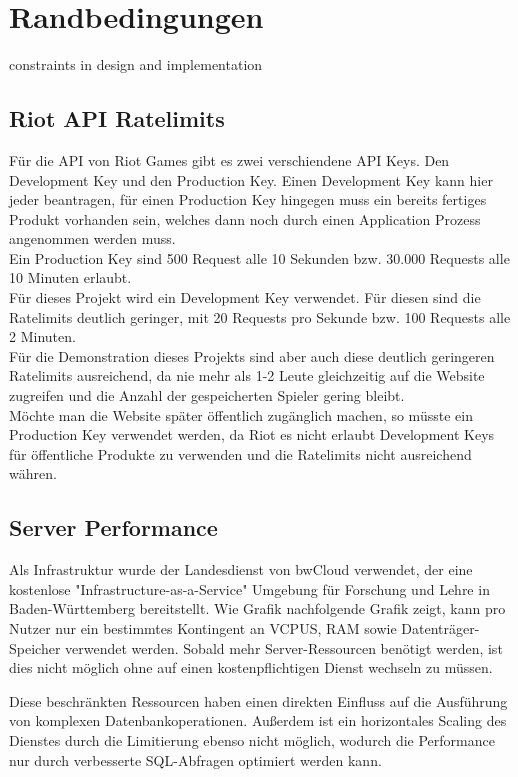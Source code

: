 \section{Randbedingungen}
constraints in design and implementation

\subsection{Riot API Ratelimits}\label{riot-api-ratelimits}
Für die API von Riot Games gibt es zwei verschiendene API Keys. Den Development Key und den Production Key. Einen Development Key kann hier jeder beantragen, für einen Production Key hingegen muss ein bereits fertiges Produkt vorhanden sein, welches dann noch durch einen Application Prozess angenommen werden muss.\\
Ein Production Key sind 500 Request alle 10 Sekunden bzw. 30.000 Requests alle 10 Minuten erlaubt.\\
Für dieses Projekt wird ein Development Key verwendet. Für diesen sind die Ratelimits deutlich geringer, mit 20 Requests pro Sekunde bzw. 100 Requests alle 2 Minuten.\\
Für die Demonstration dieses Projekts sind aber auch diese deutlich geringeren Ratelimits ausreichend, da nie mehr als 1-2 Leute gleichzeitig auf die Website zugreifen und die Anzahl der gespeicherten Spieler gering bleibt.\\
Möchte man die Website später öffentlich zugänglich machen, so müsste ein Production Key verwendet werden, da Riot es nicht erlaubt Development Keys für öffentliche Produkte zu verwenden und die Ratelimits nicht ausreichend währen.

\subsection{Server Performance}

Als Infrastruktur wurde der Landesdienst von bwCloud verwendet, der eine kostenlose
"Infrastructure-as-a-Service" Umgebung für Forschung und Lehre in Baden-Württemberg bereitstellt.
Wie Grafik nachfolgende Grafik zeigt, kann pro Nutzer nur ein bestimmtes Kontingent an VCPUS, RAM sowie Datenträger-Speicher verwendet werden.
Sobald mehr Server-Ressourcen benötigt werden, ist dies nicht möglich ohne auf einen kostenpflichtigen Dienst wechseln zu müssen.


Diese beschränkten Ressourcen haben einen direkten Einfluss auf die Ausführung von komplexen Datenbankoperationen. Außerdem ist ein
horizontales Scaling des Dienstes durch die Limitierung ebenso nicht möglich, wodurch die Performance nur durch verbesserte SQL-Abfragen
optimiert werden kann.
